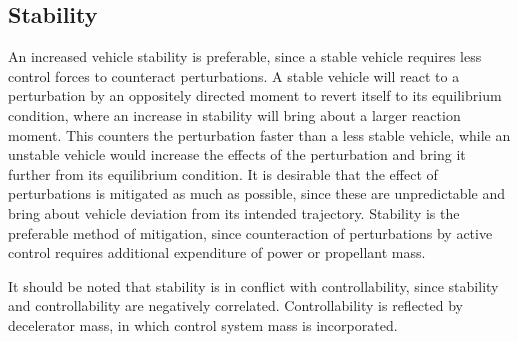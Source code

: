 \subsection{Stability}
An increased vehicle stability is preferable, since a stable vehicle requires less control forces to counteract perturbations. A stable vehicle will react to a perturbation by an oppositely directed moment to revert itself to its equilibrium condition, where an increase in stability will bring about a larger reaction moment. This counters the perturbation faster than a less stable vehicle, while an unstable vehicle would increase the effects of the perturbation and bring it further from its equilibrium condition. It is desirable that the effect of perturbations is mitigated as much as possible, since these are unpredictable and bring about vehicle deviation from its intended trajectory. Stability is the preferable method of mitigation, since counteraction of perturbations by active control requires additional expenditure of power or propellant mass. 

It should be noted that stability is in conflict with controllability, since stability and controllability are negatively correlated. Controllability is reflected by decelerator mass, in which control system mass is incorporated.




